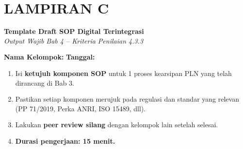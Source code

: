 \documentclass[12pt,a4paper]{report}
\newcommand{\fillline}[1][6cm]{\underline{\hspace{#1}}}
\begin{document}
\section*{\color{plnblue} LAMPIRAN C}
{\Large\bfseries Template Draft SOP Digital Terintegrasi}\\[0.15cm]
{\normalsize\color{medgray}\textit{Output Wajib Bab 4 -- Kriteria Penilaian 4.3.3}}

\vspace{0.4cm}

\noindent\textbf{Nama Kelompok:} \fillline \quad \textbf{Tanggal:} \fillline[3cm]

\begin{instruksibox}
\begin{enumerate}
    \item Isi \textbf{ketujuh komponen SOP} untuk 1 proses kearsipan PLN yang telah dirancang di Bab 3.
    \item Pastikan setiap komponen merujuk pada regulasi dan standar yang relevan (PP 71/2019, Perka ANRI, ISO 15489, dll).
    \item Lakukan \textbf{peer review silang} dengan kelompok lain setelah selesai.
    \item \textbf{Durasi pengerjaan: 15 menit.}
\end{enumerate}
\end{instruksibox}

\vspace{0.4cm}

\begin{tcolorbox}[colback=plnblue!3, colframe=plnblue!60, sharp corners, title={\small\bfseries Komponen 1: Tujuan \& Ruang Lingkup}, boxrule=0.8pt]
\vspace{2.0cm}
\end{tcolorbox}

\vspace{0.2cm}

\begin{tcolorbox}[colback=plnblue!3, colframe=plnblue!60, sharp corners, title={\small\bfseries Komponen 2: Definisi \& Akronim}, boxrule=0.8pt]
\vspace{2.0cm}
\end{tcolorbox}

\vspace{0.2cm}
\end{document}
